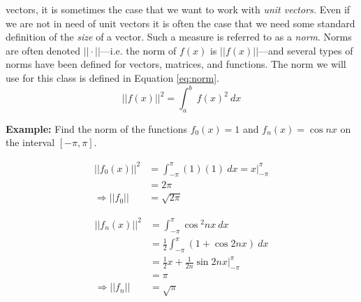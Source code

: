  vectors, it is sometimes the case that we want to work with \emph{unit vectors.} Even if we are not in need of unit vectors it is often the case that we need some standard definition of the \emph{size} of a vector. Such a measure is referred to as a \emph{norm}.  Norms are often denoted $||\cdot||$---i.e. the norm of $f(x)$ is $||f(x)||$---and several types of norms have been defined for vectors, matrices, and functions.  The norm we will use for this class is defined in Equation \ref{eq:norm}.
\begin{equation}
||f(x)||^2 = \int_{a}^{b} \ f(x)^2 \ dx
\label{eq:norm}
\end{equation}  

\vspace{0.5cm}

\noindent\textbf{Example:} Find the norm of the functions $f_0(x)=1$ and $f_n(x)=\cos{nx}$ on the interval $[-\pi,\pi]$.

\vspace{0.25cm}

\begin{align*}
||f_0(x)||^2 &= \int_{-\pi}^{\pi} (1)(1) \ dx = x\Bigr|_{-\pi}^{\pi} \\
&=2\pi \\
\Rightarrow ||f_0|| &= \sqrt{2\pi}
\end{align*}

\vspace{0.25cm}
\begin{align*}
||f_n(x)||^2 &= \int_{-\pi}^{\pi} \cos{^2nx} \ dx \\
&= \frac{1}{2}\int_{-\pi}^{\pi}\left(1+\cos{2nx}\right) \ dx \\
&= \frac{1}{2}x + \frac{1}{2n}\sin{2nx}\Bigr|_{-\pi}^{\pi} \\
&= \pi \\
\Rightarrow ||f_n|| &= \sqrt{\pi}
\end{align*}

